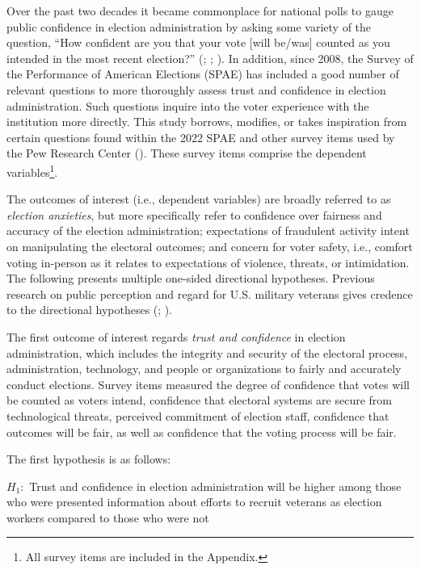 \documentclass[
  11pt,
  a4paper,
]{scrartcl}
\begin{document}
Over the past two decades it became commonplace for national polls to
gauge public confidence in election administration by asking some
variety of the question, ``How confident are you that your vote {[}will
be/was{]} counted as you intended in the most recent election?''
(;
;
). In addition, since 2008, the
Survey of the Performance of American Elections (SPAE) has included a
good number of relevant questions to more thoroughly assess trust and
confidence in election administration. Such questions inquire into the
voter experience with the institution more directly. This study borrows,
modifies, or takes inspiration from certain questions found within the
2022 SPAE and other survey items used by the Pew Research Center
(). These survey items comprise the
dependent variables\footnote{All survey items are included in the
  Appendix.}.

The outcomes of interest (i.e., dependent variables) are broadly
referred to as \emph{election anxieties}, but more specifically refer to
confidence over fairness and accuracy of the election administration;
expectations of fraudulent activity intent on manipulating the electoral
outcomes; and concern for voter safety, i.e., comfort voting in-person
as it relates to expectations of violence, threats, or intimidation. The
following presents multiple one-sided directional hypotheses. Previous
research on public perception and regard for U.S. military veterans
gives credence to the directional hypotheses
(;
).

The first outcome of interest regards \emph{trust and confidence} in
election administration, which includes the integrity and security of
the electoral process, administration, technology, and people or
organizations to fairly and accurately conduct elections. Survey items
measured the degree of confidence that votes will be counted as voters
intend, confidence that electoral systems are secure from technological
threats, perceived commitment of election staff, confidence that
outcomes will be fair, as well as confidence that the voting process
will be fair.

The first hypothesis is as follows:

\(H_{1}:\) Trust and confidence in election administration will be
higher among those who were presented information about efforts to
recruit veterans as election workers compared to those who were not
\end{document}
